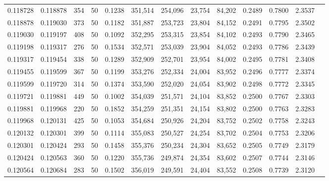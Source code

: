 \begin{tabular}{rrrrrrrrrrrrr}
0.118728 & 0.118878 &   354 &  50 &                                     0.1238 & 351,514 & 254,096 &  23,754 &  84,202 & 0.2489 & 0.7800 & 2.3537 \\
0.118878 & 0.119030 &   373 &  50 &                                     0.1182 & 351,887 & 253,723 &  23,804 &  84,152 & 0.2491 & 0.7795 & 2.3502 \\
0.119030 & 0.119197 &   408 &  50 &                                     0.1092 & 352,295 & 253,315 &  23,854 &  84,102 & 0.2493 & 0.7790 & 2.3465 \\
0.119198 & 0.119317 &   276 &  50 &                                     0.1534 & 352,571 & 253,039 &  23,904 &  84,052 & 0.2493 & 0.7786 & 2.3439 \\
0.119317 & 0.119454 &   338 &  50 &                                     0.1289 & 352,909 & 252,701 &  23,954 &  84,002 & 0.2495 & 0.7781 & 2.3408 \\
0.119455 & 0.119599 &   367 &  50 &                                     0.1199 & 353,276 & 252,334 &  24,004 &  83,952 & 0.2496 & 0.7777 & 2.3374 \\
0.119599 & 0.119720 &   314 &  50 &                                     0.1374 & 353,590 & 252,020 &  24,054 &  83,902 & 0.2498 & 0.7772 & 2.3345 \\
0.119721 & 0.119881 &   449 &  50 &                                     0.1002 & 354,039 & 251,571 &  24,104 &  83,852 & 0.2500 & 0.7767 & 2.3303 \\
0.119881 & 0.119968 &   220 &  50 &                                     0.1852 & 354,259 & 251,351 &  24,154 &  83,802 & 0.2500 & 0.7763 & 2.3283 \\
0.119968 & 0.120131 &   425 &  50 &                                     0.1053 & 354,684 & 250,926 &  24,204 &  83,752 & 0.2502 & 0.7758 & 2.3243 \\
0.120132 & 0.120301 &   399 &  50 &                                     0.1114 & 355,083 & 250,527 &  24,254 &  83,702 & 0.2504 & 0.7753 & 2.3206 \\
0.120301 & 0.120424 &   293 &  50 &                                     0.1458 & 355,376 & 250,234 &  24,304 &  83,652 & 0.2505 & 0.7749 & 2.3179 \\
0.120424 & 0.120563 &   360 &  50 &                                     0.1220 & 355,736 & 249,874 &  24,354 &  83,602 & 0.2507 & 0.7744 & 2.3146 \\
0.120564 & 0.120684 &   283 &  50 &                                     0.1502 & 356,019 & 249,591 &  24,404 &  83,552 & 0.2508 & 0.7739 & 2.3120 \\

\end{tabular}
